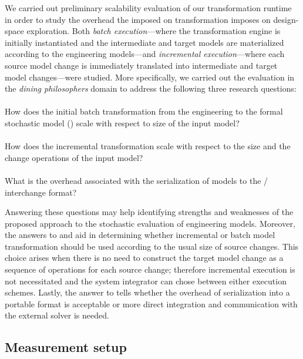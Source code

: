 We carried out preliminary scalability evaluation of our transformation runtime in order to study the overhead the imposed on transformation imposes on design-space exploration. Both \emph{batch execution}---where the transformation engine is initially instantiated and the intermediate and target  models are materialized according to the engineering models---and \emph{incremental execution}---where each source model change is immediately translated into intermediate and target model changes---were studied. More specifically, we carried out the evaluation in the \emph{dining philosophers} domain to address the following three research questions:
\paragraph{} How does the initial batch transformation from the engineering  to the formal stochastic model () scale with respect to size of the input model?
\paragraph{} How does the incremental transformation scale with respect to the size and the change operations of the input model?
\paragraph{} What is the overhead associated with the serialization of models to the /  interchange format?

\newpara Answering these questions may help identifying strengths and weaknesses of the proposed approach to the stochastic evaluation of engineering models. Moreover, the answers to \textbf{} and  \textbf{} aid in determining whether incremental or batch model transformation should be used according to the usual size of source changes. This choice arises when there is no need to construct the target model change as a sequence of operations for each source change; therefore incremental execution is not necessitated and the system integrator can chose between either execution schemes. Lastly, the answer to \textbf{} tells whether the overhead of serialization into a portable format is acceptable or more direct integration and communication with the external solver is needed.

\subsection{Measurement setup}

